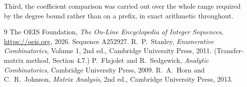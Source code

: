 \documentclass[11pt,a4paper]{article}
\theoremstyle{plain}
\theoremstyle{definition}
\begin{document}
Third, the coefficient comparison was carried out over the whole range required by the degree
bound rather than on a prefix, in exact arithmetic throughout.

\begin{thebibliography}{9}
 The OEIS Foundation, \emph{The On-Line Encyclopedia of Integer
Sequences}, \url{https://oeis.org}, 2026. Sequence A252927.
 R.~P.~Stanley, \emph{Enumerative Combinatorics}, Volume 1, 2nd ed.,
Cambridge University Press, 2011. (Transfer-matrix method, Section 4.7.)
 P.~Flajolet and R.~Sedgewick, \emph{Analytic Combinatorics}, Cambridge
University Press, 2009.
 R.~A.~Horn and C.~R.~Johnson, \emph{Matrix Analysis}, 2nd ed., Cambridge
University Press, 2013.
\end{thebibliography}
\end{document}
